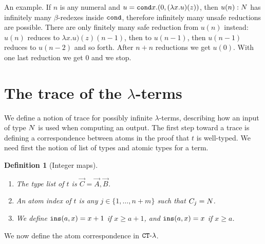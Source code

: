 \documentclass{article}
\newtheorem{definition}[theorem]{Definition}
\begin{document}
An example. If $n$ is any numeral and $u = {\tt cond} x. (0, (\lambda x.u)(z) )$, then 
$u(n): {N}$ has infinitely many $\beta$-redexes inside 
${\tt cond}$, therefore infinitely many unsafe reductions are possible. There are only finitely many safe reduction
from $u(n)$ instead: $u(n)$ reduces to $\lambda x.u)(z)(n-1)$, then to $u(n-1)$, 
then $u(n-1)$ reduces to $u(n-2)$ and so forth.
After $n+n$ reductions we get $u(0)$. With one last reduction we get $0$ and we stop. 


\section{The trace of the $\lambda$-terms}
We define a notion of trace for possibly infinite $\lambda$-terms, describing how an input of type ${N}$
is used when computing an output.
The first step toward a trace is defining a correspondence between atoms in the
proof that $t$ is well-typed. We need first the notion of list of types and atomic types for a term.

\begin{definition}[Integer maps]
\begin{enumerate}
\item
The type list of $t$ is $\vec{C} = \vec{A},\vec{B}$. 

\item
An atom index of $t$ is any $j \in \{1, \ldots, n+m\}$ such that $C_j = {N}$.

\item
We define ${\tt ins}(a,x)=x+1$ if $x \ge a+1$, and ${\tt ins}(a,x)=x$ if $x\ge a$.

\end{enumerate}
\end{definition}

We now define the atom correspondence in ${ {\tt CT} \mbox{-} \lambda}$.
\end{document}
